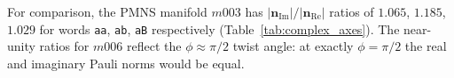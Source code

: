 \documentclass[floatfix,aps,prd,twocolumn,showpacs,superscriptaddress,longbibliography]{revtex4-2}
\begin{document}
\noindent
For comparison, the PMNS manifold $m003$ has
$|\mathbf{n}_{\mathrm{Im}}|/|\mathbf{n}_{\mathrm{Re}}|$
ratios of $1.065$, $1.185$, $1.029$ for words
\texttt{aa}, \texttt{ab}, \texttt{aB} respectively
(Table~\ref{tab:complex_axes}).
The near-unity ratios for $m006$ reflect the $\phi \approx \pi/2$
twist angle: at exactly $\phi = \pi/2$ the real and imaginary
Pauli norms would be equal.


\end{document}
